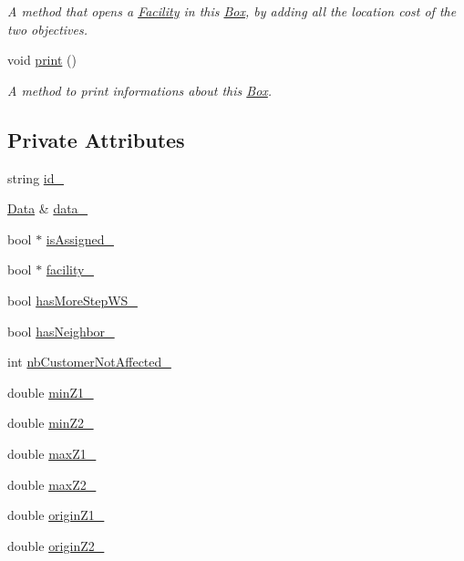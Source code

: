 \begin{DoxyCompactItemize}
\begin{DoxyCompactList}\small\item\em \-A method that opens a {\ttfamily \hyperlink{classFacility}{\-Facility}} in this {\ttfamily \hyperlink{classBox}{\-Box}}, by adding all the location cost of the two objectives. \end{DoxyCompactList}\item 
void \hyperlink{classBox_a7f9cef3d9324289ae0fb4ec1aa50db9d}{print} ()
\begin{DoxyCompactList}\small\item\em \-A method to print informations about this {\ttfamily \hyperlink{classBox}{\-Box}}. \end{DoxyCompactList}\end{DoxyCompactItemize}
\subsection*{\-Private \-Attributes}
\begin{DoxyCompactItemize}
\item 
string \hyperlink{classBox_a69b7a7bb25fe90a42147cd05007854da}{id\-\_\-}
\item 
\hyperlink{classData}{\-Data} \& \hyperlink{classBox_add736972063b9a9c0239194eaf31efae}{data\-\_\-}
\item 
bool $\ast$ \hyperlink{classBox_abbfd7bd74fe08139f7e6853e129a8a61}{is\-Assigned\-\_\-}
\item 
bool $\ast$ \hyperlink{classBox_a2193b73a3e12612041dedf93ec410f59}{facility\-\_\-}
\item 
bool \hyperlink{classBox_a177908b9eaab60f32c86800a2f725ecd}{has\-More\-Step\-W\-S\-\_\-}
\item 
bool \hyperlink{classBox_a6018908ca53a87f0265fbeefd8884a4b}{has\-Neighbor\-\_\-}
\item 
int \hyperlink{classBox_a9b4fe28d0a913cee7c6126b5283f6073}{nb\-Customer\-Not\-Affected\-\_\-}
\item 
double \hyperlink{classBox_ac2054bd31949983a7d02a5229b9aa505}{min\-Z1\-\_\-}
\item 
double \hyperlink{classBox_a79cb036404755c024cb2ec38c2d6f51e}{min\-Z2\-\_\-}
\item 
double \hyperlink{classBox_a677f915123e884e3ccf7c751bfbd7cfa}{max\-Z1\-\_\-}
\item 
double \hyperlink{classBox_a5222f7d544c4361107c8ff730d341be1}{max\-Z2\-\_\-}
\item 
double \hyperlink{classBox_ad9dd1c25f765a4b055e61b98fca017a7}{origin\-Z1\-\_\-}
\item 
double \hyperlink{classBox_a92db5d83336e00813c4131d52e12a1b9}{origin\-Z2\-\_\-}
\end{DoxyCompactItemize}
